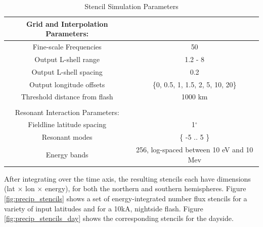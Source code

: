 \begin{table}[t]
\caption{Stencil Simulation Parameters}
\begin{center}

\begin{tabular}{c|c}
Grid and Interpolation Parameters: \\
\hline \hline
Fine-scale Frequencies & 50 \\
Output L-shell range & 1.2 - 8 \\
Output L-shell spacing & 0.2 \\
Output longitude offsets & \{0, 0.5, 1, 1.5, 2, 5, 10, 20\} \\
Threshold distance from flash & 1000 km \\
 & \\
Resonant Interaction Parameters: \\
\hline \hline
Fieldline latitude spacing & 1$^\circ$ \\
Resonant modes & \{ -5 .. 5 \} \\
Energy bands & 256, log-spaced between 10 eV and 10 Mev\end{tabular}
\end{center}
\label{tab:stencil_params}
\end{table}%

After integrating over the time axis, the resulting stencils each have dimensions (lat $\times$ lon $\times$ energy), for both the northern and southern hemispheres. Figure \ref{fig:precip_stencils} shows a set of energy-integrated number flux stencils for a variety of input latitudes and \kp{} for a 10kA, nightside flash. Figure \ref{fig:precip_stencils_day} shows the corresponding stencils for the dayside.

